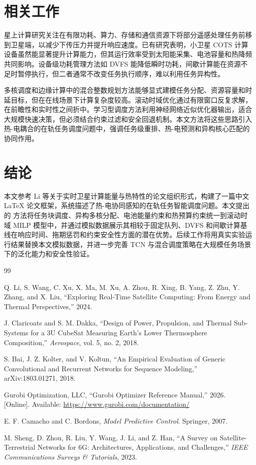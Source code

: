 \section{相关工作}

星上计算研究关注在有限功耗、算力、存储和通信资源下将部分遥感处理任务前移到卫星端，以减少下传压力并提升响应速度。已有研究表明，小卫星 COTS 计算设备虽然能显著提升计算能力，但其运行效率受到太阳能采集、电池容量和热降频共同影响。设备级功耗管理方法如 DVFS 能降低瞬时功耗，间歇计算能在资源不足时暂停执行，但二者通常不改变任务执行顺序，难以利用任务异构性。

多核调度和边缘计算中的混合整数规划方法能够显式建模任务分配、资源容量和时延目标，但在在线场景下计算复杂度较高。滚动时域优化通过有限窗口反复求解，在前瞻性和实时性之间折中。学习型调度方法利用神经网络近似优化器输出，适合大规模快速决策，但必须结合约束过滤和安全回退机制。本文方法将这些思路引入热-电耦合的在轨任务调度问题中，强调任务级重排、热-电预测和异构核心匹配的协同作用。

\section{结论}

本文参考 Li 等关于实时卫星计算能量与热特性的论文组织形式，构建了一篇中文 LaTeX 论文框架，系统描述了热-电协同感知的在轨任务智能调度问题。本文提出的 \method{} 方法将任务块调度、异构多核分配、电池能量约束和热预算约束统一到滚动时域 MILP 模型中，并通过模拟数据展示其相较于固定队列、DVFS 和间歇计算基线在响应时间、拖期惩罚和约束安全性方面的潜在优势。后续工作将用真实实验运行结果替换本文模拟数据，并进一步完善 TCN 与混合调度策略在大规模任务场景下的泛化能力和安全性验证。

\begin{thebibliography}{99}

Q. Li, S. Wang, C. Xu, X. Ma, M. Xu, A. Zhou, R. Xing, B. Yang, Z. Zhu, Y. Zhang, and X. Liu,
``Exploring Real-Time Satellite Computing: From Energy and Thermal Perspectives,''
2024.

J. Claricoats and S. M. Dakka,
``Design of Power, Propulsion, and Thermal Sub-Systems for a 3U CubeSat Measuring Earth's Lower Thermosphere Composition,''
\emph{Aerospace}, vol. 5, no. 2, 2018.

S. Bai, J. Z. Kolter, and V. Koltun,
``An Empirical Evaluation of Generic Convolutional and Recurrent Networks for Sequence Modeling,''
arXiv:1803.01271, 2018.

Gurobi Optimization, LLC,
``Gurobi Optimizer Reference Manual,''
2026. [Online]. Available: \url{https://www.gurobi.com/documentation/}

E. F. Camacho and C. Bordons,
\emph{Model Predictive Control}.
Springer, 2007.

M. Sheng, D. Zhou, R. Liu, Y. Wang, J. Li, and Z. Han,
``A Survey on Satellite-Terrestrial Networks for 6G: Architectures, Applications, and Challenges,''
\emph{IEEE Communications Surveys \& Tutorials}, 2023.

\end{thebibliography}


